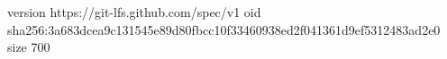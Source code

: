 version https://git-lfs.github.com/spec/v1
oid sha256:3a683dcea9c131545e89d80fbcc10f33460938ed2f041361d9ef5312483ad2e0
size 700
